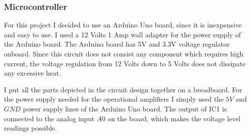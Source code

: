 \subsubsection{Microcontroller}
For this project I decided to use an Arduino Uno board, since it is inexpensive and easy to use. I used a 12 Volts 1 Amp wall adapter for the power supply of the Arduino board. The Arduino board has 5V and 3.3V voltage regulator onboard. Since this circuit does not consist any component which requires high current, the voltage regulation from 12 Volts down to 5 Volts does not dissipate any excessive heat. \par
I put all the parts depicted in the circuit design together on a breadboard. For the power supply needed for the operational amplifiers I simply used the $5V$ and $GND$ power supply lines of the Arduino Uno board. The output of IC1 is connected to the analog input $A0$ on the board, which makes the voltage level readings possible. 


